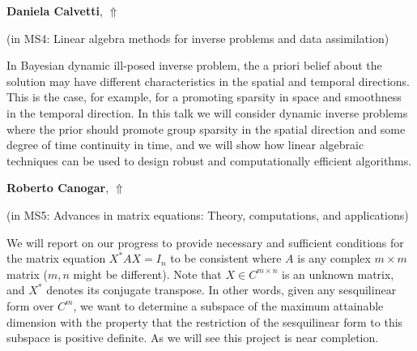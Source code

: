 \documentclass[ILAS2025-program.tex]{subfiles}
\begin{document}
\hypertarget{down0311}{}\begin{ilasabstract}
    
\textbf{Daniela Calvetti},  \hfill \hyperlink{up0311}{$\Uparrow$}
    
    
(in {\color{mstitle}MS4: Linear algebra methods for inverse problems and data assimilation})
        
\mtskip
    In Bayesian dynamic ill-posed inverse problem, the a priori belief about the solution may have different characteristics in the spatial and temporal directions.  This is the case, for example, for a  promoting sparsity in space  and  smoothness in the temporal direction. In this talk we will consider dynamic inverse problems where the prior should promote group sparsity  in the spatial direction and some degree of time continuity in time, and we will show how linear algebraic techniques can be used to design robust and computationally efficient algorithms. 

\end{ilasabstract}
    

\hypertarget{down0320}{}\begin{ilasabstract}
    
\textbf{Roberto Canogar},  \hfill \hyperlink{up0320}{$\Uparrow$}
    
    
(in {\color{mstitle}MS5: Advances in matrix equations: Theory, computations, and applications})
        
\mtskip
    We will report on our progress to provide necessary and sufficient conditions for the matrix equation $X^*AX=I_n$ to be consistent where $A$ is any complex $m\times m$ matrix ($m, n$ might be different). Note that $X\in C^{m\times n}$ is an unknown matrix, and $X^*$ denotes its conjugate transpose. In other words, given any sesquilinear form over $C^m$, we want to determine a subspace of the maximum attainable dimension with the property that the restriction of the sesquilinear form to this subspace is positive definite. As we will see this project is near completion.

\end{ilasabstract}
    
\end{document}
